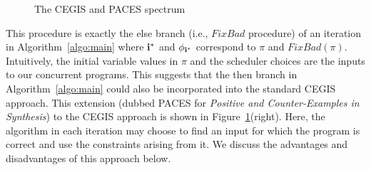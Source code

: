 \documentclass{llncs}
\newcommand\PProg{\ensuremath{\mathcal{P}}}
\newcommand\trace{\pi}
\newcommand\LearnGood{\mathit{LearnGood}}
\newcommand\FixBad{\mathit{FixBad}}
\begin{document}
\begin{figure}
  \begin{minipage}{0.3\textwidth}
  \end{minipage}
  \hfill
  \begin{minipage}{0.6\textwidth}
  \end{minipage}
  \vspace{-2ex}
  \caption{The CEGIS and PACES spectrum}
  \label{fig:cegis}
\end{figure}

This procedure is exactly the else branch (i.e., $\FixBad$ procedure) of
an iteration in Algorithm~\ref{algo:main} where $\mathbf{i}^*$
and $\phi_{\mathbf{i}^*}$ correspond to $\trace$ and $\FixBad(\trace)$.
Intuitively, the initial variable values in $\trace$ and the scheduler
choices are the inputs to our concurrent programs.
This suggests that the then branch in Algorithm~\ref{algo:main} could
also be incorporated into the standard CEGIS approach.
This extension (dubbed PACES for {\em Positive and Counter-Examples 
in Synthesis}) to the CEGIS approach is shown in
Figure~\ref{fig:cegis}(right).
Here, the algorithm in each iteration may choose to find an input for
which the program is correct and use the constraints arising
from it.
We discuss the advantages and disadvantages of this approach below.
\end{document}
